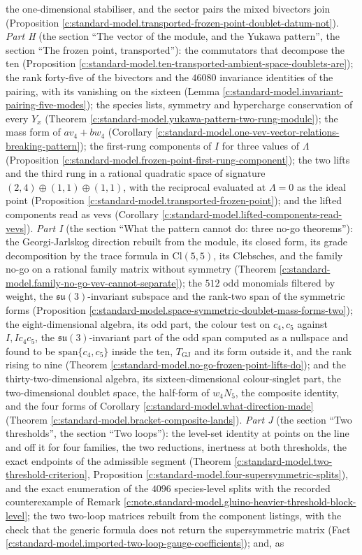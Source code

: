 \documentclass[11pt]{article}
\theoremstyle{definition}
\theoremstyle{plain}
\providecommand{\Cl}{}\renewcommand{\Cl}{\mathrm{Cl}}
\providecommand{\su}{}\renewcommand{\su}{\mathfrak{su}}
\begin{document}
the one-dimensional stabiliser, and the sector pairs the mixed bivectors join (Proposition \ref{c:standard-model.transported-frozen-point-doublet-datum-not}). \emph{Part H} (the section ``The vector of the module, and the Yukawa pattern'', the section ``The frozen point, transported''): the commutators that decompose the ten (Proposition \ref{c:standard-model.ten-transported-ambient-space-doublets-are}); the rank forty-five of the bivectors and the $46080$ invariance identities of the pairing, with its vanishing on the sixteen (Lemma \ref{c:standard-model.invariant-pairing-five-modes}); the species lists, symmetry and hypercharge conservation of every $Y_{x}$ (Theorem \ref{c:standard-model.yukawa-pattern-two-rung-module}); the mass form of $a v_{4} + b w_{4}$ (Corollary \ref{c:standard-model.one-vev-vector-relations-breaking-pattern}); the first-rung components of $I$ for three values of $\Lambda$ (Proposition \ref{c:standard-model.frozen-point-first-rung-component}); the two lifts and the third rung in a rational quadratic space of signature $(2,4) \oplus (1,1) \oplus (1,1)$, with the reciprocal evaluated at $\Lambda = 0$ as the ideal point (Proposition \ref{c:standard-model.transported-frozen-point}); and the lifted components read as vevs (Corollary \ref{c:standard-model.lifted-components-read-vevs}). \emph{Part I} (the section ``What the pattern cannot do: three no-go theorems''): the Georgi-Jarlskog direction rebuilt from the module, its closed form, its grade decomposition by the trace formula in $\Cl(5,5)$, its Clebsches, and the family no-go on a rational family matrix without symmetry (Theorem \ref{c:standard-model.family-no-go-vev-cannot-separate}); the $512$ odd monomials filtered by weight, the $\su(3)$-invariant subspace and the rank-two span of the symmetric forms (Proposition \ref{c:standard-model.space-symmetric-doublet-mass-forms-two}); the eight-dimensional algebra, its odd part, the colour test on $c_{4}, c_{5}$ against $I, Ic_{4}c_{5}$, the $\su(3)$-invariant part of the odd span computed as a nullspace and found to be $\mathrm{span}\{c_{4}, c_{5}\}$ inside the ten, $T_{\mathrm{GJ}}$ and its form outside it, and the rank rising to nine (Theorem \ref{c:standard-model.no-go-frozen-point-lifts-do}); and the thirty-two-dimensional algebra, its sixteen-dimensional colour-singlet part, the two-dimensional doublet space, the half-form of $w_{4}N_{5}$, the composite identity, and the four forms of Corollary \ref{c:standard-model.what-direction-made} (Theorem \ref{c:standard-model.bracket-composite-lands}). \emph{Part J} (the section ``Two thresholds'', the section ``Two loops''): the level-set identity at points on the line and off it for four families, the two reductions, inertness at both thresholds, the exact endpoints of the admissible segment (Theorem \ref{c:standard-model.two-threshold-criterion}, Proposition \ref{c:standard-model.four-supersymmetric-splits}), and the exact enumeration of the $4096$ species-level splits with the recorded counterexample of Remark \ref{c:note.standard-model.gluino-heavier-threshold-block-level}; the two two-loop matrices rebuilt from the component listings, with the check that the generic formula does not return the supersymmetric matrix (Fact \ref{c:standard-model.imported-two-loop-gauge-coefficients}); and, as 
\end{document}
